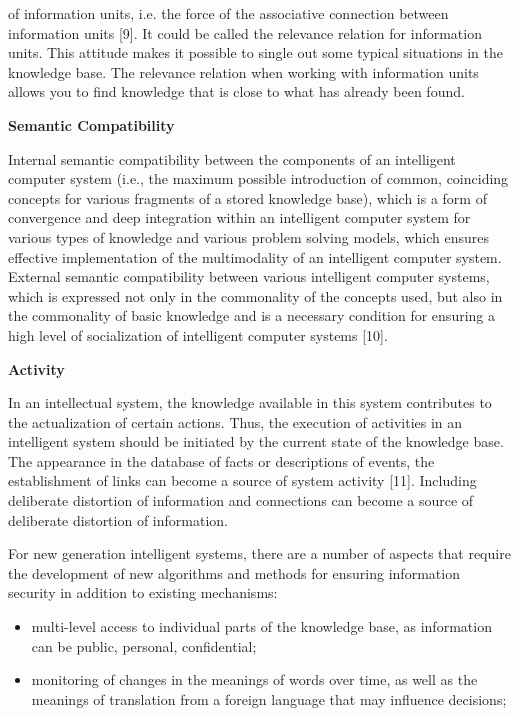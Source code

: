\documentclass{article}
\begin{document}
\begin{multicols}{2}
of information units, i.e. the force of the associative
connection between information units [9]. It could be
called the relevance relation for information units. This
attitude makes it possible to single out some typical
situations in the knowledge base. The relevance relation
when working with information units allows you to find
knowledge that is close to what has already been found.
\par
\textbf{Semantic Compatibility}
\par
Internal semantic compatibility between the components of an intelligent computer system (i.e., the maximum
possible introduction of common, coinciding concepts for
various fragments of a stored knowledge base), which
is a form of convergence and deep integration within
an intelligent computer system for various types of
knowledge and various problem solving models, which
ensures effective implementation of the multimodality
of an intelligent computer system. External semantic
compatibility between various intelligent computer systems, which is expressed not only in the commonality of
the concepts used, but also in the commonality of basic
knowledge and is a necessary condition for ensuring a
high level of socialization of intelligent computer systems
[10].
\par
\textbf{Activity}\par
In an intellectual system, the knowledge available in
this system contributes to the actualization of certain
actions. Thus, the execution of activities in an intelligent
system should be initiated by the current state of the
knowledge base. The appearance in the database of facts
or descriptions of events, the establishment of links
can become a source of system activity [11]. Including
deliberate distortion of information and connections can
become a source of deliberate distortion of information.
\par
For new generation intelligent systems, there are a
number of aspects that require the development of new
algorithms and methods for ensuring information security
in addition to existing mechanisms:



  \begin{itemize}
    \item multi-level access to individual parts of the knowledge base, as information can be public, personal,
confidential;

    \item monitoring of changes in the meanings of words over
time, as well as the meanings of translation from a
foreign language that may influence decisions;


\end{itemize}
\end{multicols}
\end{document}

